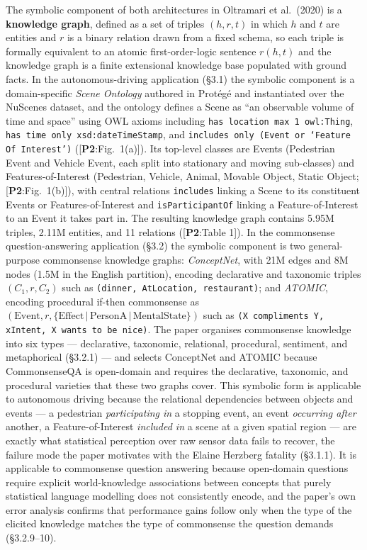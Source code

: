 \documentclass[11pt, a4paper]{article}
\newcommand{\paperref}[1]{\textcolor{srcBd}{\small[\textbf{P2}:#1]}}
\begin{document}
\begin{prosebox}
The symbolic component of both architectures in Oltramari et al.\ (2020) is a \textbf{knowledge graph}, defined as a set of triples \((h, r, t)\) in which \(h\) and \(t\) are entities and \(r\) is a binary relation drawn from a fixed schema, so each triple is formally equivalent to an atomic first-order-logic sentence \(r(h,t)\) and the knowledge graph is a finite extensional knowledge base populated with ground facts. In the autonomous-driving application (§3.1) the symbolic component is a domain-specific \emph{Scene Ontology} authored in Protégé and instantiated over the NuScenes dataset, and the ontology defines a Scene as ``an observable volume of time and space'' using OWL axioms including \texttt{has location max 1 owl:Thing}, \texttt{has time only xsd:dateTimeStamp}, and \texttt{includes only (Event or `Feature Of Interest')} (\paperref{Fig.\ 1(a)}). Its top-level classes are Events (Pedestrian Event and Vehicle Event, each split into stationary and moving sub-classes) and Features-of-Interest (Pedestrian, Vehicle, Animal, Movable Object, Static Object; \paperref{Fig.\ 1(b)}), with central relations \texttt{includes} linking a Scene to its constituent Events or Features-of-Interest and \texttt{isParticipantOf} linking a Feature-of-Interest to an Event it takes part in. The resulting knowledge graph contains 5.95M triples, 2.11M entities, and 11 relations (\paperref{Table 1}). In the commonsense question-answering application (§3.2) the symbolic component is two general-purpose commonsense knowledge graphs: \emph{ConceptNet}, with 21M edges and 8M nodes (1.5M in the English partition), encoding declarative and taxonomic triples \((C_1, r, C_2)\) such as \texttt{(dinner, AtLocation, restaurant)}; and \emph{ATOMIC}, encoding procedural if-then commonsense as \((\mathrm{Event}, r, \{\mathrm{Effect}\,|\,\mathrm{PersonA}\,|\,\mathrm{MentalState}\})\) such as \texttt{(X compliments Y, xIntent, X wants to be nice)}. The paper organises commonsense knowledge into six types — declarative, taxonomic, relational, procedural, sentiment, and metaphorical (§3.2.1) — and selects ConceptNet and ATOMIC because CommonsenseQA is open-domain and requires the declarative, taxonomic, and procedural varieties that these two graphs cover. This symbolic form is applicable to autonomous driving because the relational dependencies between objects and events — a pedestrian \emph{participating in} a stopping event, an event \emph{occurring after} another, a Feature-of-Interest \emph{included in} a scene at a given spatial region — are exactly what statistical perception over raw sensor data fails to recover, the failure mode the paper motivates with the Elaine Herzberg fatality (§3.1.1). It is applicable to commonsense question answering because open-domain questions require explicit world-knowledge associations between concepts that purely statistical language modelling does not consistently encode, and the paper's own error analysis confirms that performance gains follow only when the type of the elicited knowledge matches the type of commonsense the question demands (§3.2.9--10).
\end{prosebox}
\end{document}
